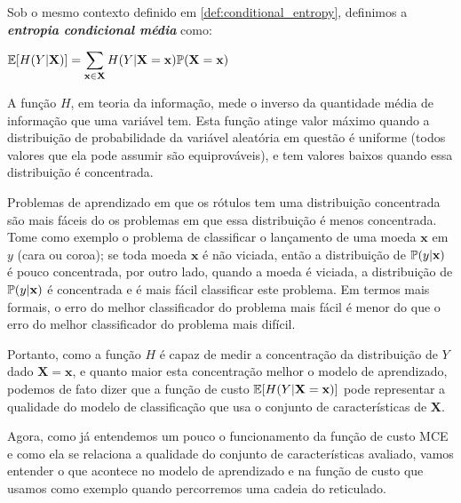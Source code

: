 \begin{mydefinition}
Sob o mesmo contexto definido em \ref{def:conditional_entropy}, 
definimos a {\bf \em entropia condicional média} como:
\begin{center}
$
\begin{aligned}
    \mathbb{E}[H (Y | \mathbf{X})] = 
    \sum_{\mathbf{x} \in \mathbf{X}} H (Y | \mathbf{X = x}) \mathbb{P} (\mathbf{X = x})
\end{aligned}
$
\end{center}
\end{mydefinition}


A função $H$, em teoria da informação, mede o inverso da quantidade 
média de informação que uma variável tem. Esta função atinge valor 
máximo quando a distribuição de probabilidade da variável aleatória em
questão é uniforme (todos valores que ela pode assumir são 
equiprováveis), e tem valores baixos quando essa distribuição é 
concentrada. 

Problemas de aprendizado em que os rótulos tem uma distribuição 
concentrada são mais fáceis do os problemas em que essa distribuição é 
menos concentrada. Tome como exemplo o problema de
classificar o lançamento de uma moeda $\mathbf{x}$ em $y$ (cara ou 
coroa); se toda moeda $\mathbf{x}$ é não viciada, então a distribuição
de $\mathbb{P} (y | \mathbf{x})$ é pouco concentrada, por outro lado,
quando a moeda é viciada, a distribuição de 
$\mathbb{P} (y | \mathbf{x})$ é concentrada e é mais fácil 
classificar este problema. Em termos mais formais, o erro do melhor 
classificador do problema mais fácil é menor do que o erro do melhor 
classificador do problema mais difícil.

Portanto, como a função $H$ é capaz de medir a concentração da 
distribuição de $Y$ dado $\mathbf{X = x}$, e quanto maior esta 
concentração melhor o modelo de aprendizado, podemos de fato dizer que a
função de custo $\mathbb{E}[H (Y | \mathbf{X = x})]$ pode representar
a qualidade do modelo de classificação que usa o conjunto de 
características de $\mathbf{X}$.

Agora, como já entendemos um pouco o funcionamento da função de custo
MCE e como ela se relaciona a qualidade do conjunto de características 
avaliado, vamos entender o que acontece no modelo de aprendizado e na 
função de custo que usamos como exemplo quando percorremos uma cadeia
do reticulado. 

